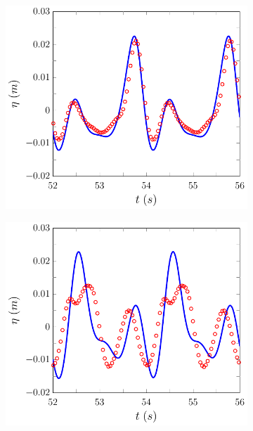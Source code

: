 %
\begin{figure}
	\centering
	\begin{subfigure}{0.5\textwidth}
		\includegraphics[width=\textwidth]{./chp6/figures/Experiment/Beji/sl/FEVMWG5.pdf}
		\vspace{0.5cm}
	\end{subfigure}%
	\begin{subfigure}{0.5\textwidth}
		\includegraphics[width=\textwidth]{./chp6/figures/Experiment/Beji/sl/FEVMWG6.pdf}

\end{subfigure}
\end{figure}
